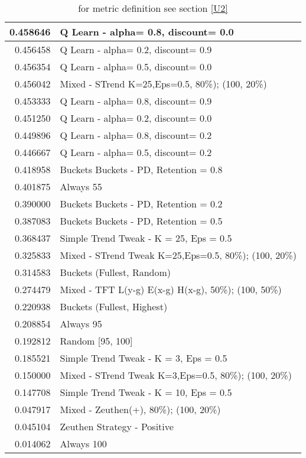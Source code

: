 \begin{table}[!hbtp]
\begin{footnotesize}
\begin{tabular}{|r|l|}
0.458646 & Q Learn - alpha= 0.8, discount= 0.0\\ \hline
0.456458 & Q Learn - alpha= 0.2, discount= 0.9\\ \hline
0.456354 & Q Learn - alpha= 0.5, discount= 0.0\\ \hline
0.456042 & Mixed - {STrend K=25,Eps=0.5, 80\%); (100, 20\%)}\\ \hline
0.453333 & Q Learn - alpha= 0.8, discount= 0.9\\ \hline
0.451250 & Q Learn - alpha= 0.2, discount= 0.0\\ \hline
0.449896 & Q Learn - alpha= 0.8, discount= 0.2\\ \hline
0.446667 & Q Learn - alpha= 0.5, discount= 0.2\\ \hline
0.418958 & Buckets Buckets - PD, Retention = 0.8\\ \hline
0.401875 & Always 55\\ \hline
0.390000 & Buckets Buckets - PD, Retention = 0.2\\ \hline
0.387083 & Buckets Buckets - PD, Retention = 0.5\\ \hline
0.368437 & Simple Trend Tweak - K = 25, Eps = 0.5\\ \hline
0.325833 & Mixed - {STrend Tweak K=25,Eps=0.5, 80\%); (100, 20\%)}\\ \hline
0.314583 & Buckets (Fullest, Random)\\ \hline
0.274479 & Mixed - {TFT L(y-g) E(x-g) H(x-g), 50\%); (100, 50\%)}\\ \hline
0.220938 & Buckets (Fullest, Highest)\\ \hline
0.208854 & Always 95\\ \hline
0.192812 & Random [95, 100]\\ \hline
0.185521 & Simple Trend Tweak - K = 3, Eps = 0.5\\ \hline
0.150000 & Mixed - {STrend Tweak K=3,Eps=0.5, 80\%); (100, 20\%)}\\ \hline
0.147708 & Simple Trend Tweak - K = 10, Eps = 0.5\\ \hline
0.047917 & Mixed - {Zeuthen(+), 80\%); (100, 20\%)}\\ \hline
0.045104 & Zeuthen Strategy - Positive\\ \hline
0.014062 & Always 100\\ \hline
\end{tabular}
\caption{for metric definition see section \eqref{U2}}
\end{footnotesize}
\end{table}

